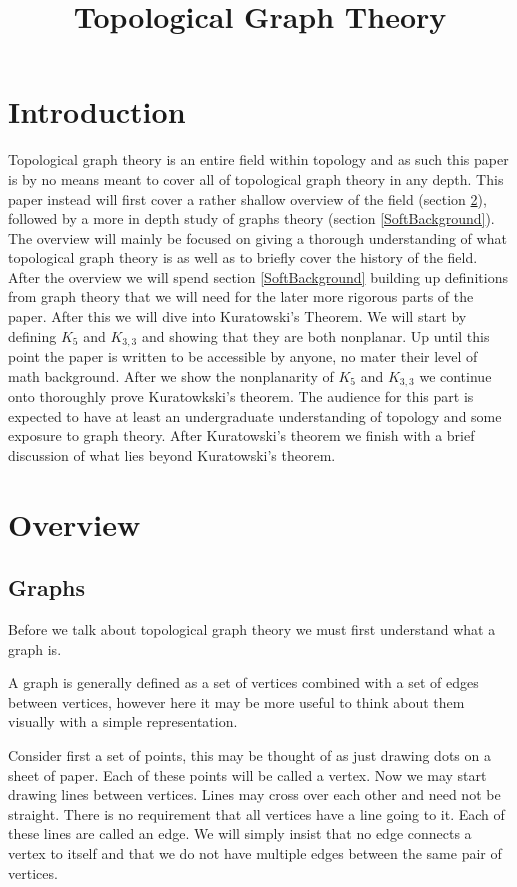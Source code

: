 \documentclass{article}
\title{Topological Graph Theory}
\begin{document}
\maketitle
\tableofcontents



\section{Introduction}
Topological graph theory is an entire field within topology and as such this paper is by no means meant to cover all of topological graph theory in any depth. This paper instead will first cover a rather shallow overview of the field (section \ref{SoftOverview}), followed by a more in depth study of graphs theory (section \ref{SoftBackground}). The overview will mainly be focused on giving a thorough understanding of what topological graph theory is as well as to briefly cover the history of the field. After the overview we will spend section \ref{SoftBackground} building up definitions from graph theory that we will need for the later more rigorous parts of the paper. After this we will dive into Kuratowski's Theorem. We will start by defining $K_5$ and $K_{3,3}$ and showing that they are both nonplanar. Up until this point the paper is written to be accessible by anyone, no mater their level of math background. After we show the nonplanarity of $K_5$ and $K_{3,3}$ we continue onto thoroughly prove Kuratowkski's theorem. The audience for this part is expected to have at least an undergraduate understanding of topology and some exposure to graph theory. After Kuratowski's theorem we finish with a brief discussion of what lies beyond Kuratowski's theorem.

\section{Overview} \label{SoftOverview}
\subsection{Graphs}
Before we talk about topological graph theory we must first understand what a graph is.

A graph is generally defined as a set of vertices combined with a set of edges between vertices, however here it may be more useful to think about them visually with a simple representation.

Consider first a set of points, this may be thought of as just drawing dots on a sheet of paper. Each of these points will be called a vertex. Now we may start drawing lines between vertices. Lines may cross over each other and need not be straight. There is no requirement that all vertices have a line going to it. Each of these lines are called an edge. We will simply insist that no edge connects a vertex to itself and that we do not have multiple edges between the same pair of vertices.
\end{document}
